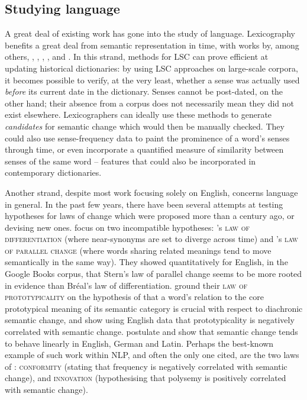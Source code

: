 \documentclass[output=paper]{langscibook}
\begin{document}
\subsection{Studying language}

A great deal of  existing work has gone into the study of language. 
Lexicography benefits a great deal from semantic representation in time, with works by, among others, \citet{lau-etal-2012-word},  \citet{falk2014}, \citet{fiser-ljubesic-2018}, \citet{klosaluengen}, and \citet{torresrivera2020detecting}.
In this strand, methods for LSC can prove efficient at updating historical dictionaries: by using LSC approaches on large-scale corpora, it becomes possible to verify, at the very least, whether a sense was actually used \emph{before} its current date in the dictionary. 
Senses cannot be post-dated, on the other hand; their absence from a corpus does not necessarily mean they did not exist elsewhere. 
Lexicographers can ideally use these methods to generate \emph{candidates} for semantic change which would then be manually checked. They could also use sense-frequency data to paint the prominence of a word's senses through time, or even incorporate a quantified measure of similarity between senses of the same word -- features that could also be incorporated in contemporary dictionaries.

Another strand, despite most work focusing solely on English, concerns language in general. 
In the past few years, there have been several attempts at testing hypotheses for laws of change which were proposed more than a century ago, or devising new ones.
\citet{xu15} focus on two incompatible hypotheses: \citet{breal1897essai}'s \textsc{law of differentiation} (where near-synonyms are set to diverge across time) and \citet{stern1921swift}'s \textsc{law of parallel change} (where words sharing related meanings tend to move semantically in the same way). They showed quantitatively for English, in the Google Books corpus, that Stern's law of parallel change seems to be more rooted in evidence than Bréal's law of differentiation. 
\citet{dubossarsky2015bottom} ground their \textsc{law of prototypicality} on the hypothesis of \citet{geeraerts1997diachronic} that a word's relation to the core prototypical meaning of its semantic category is crucial with respect to diachronic semantic change, and show using English data that prototypicality is negatively correlated with semantic change.
\citet{eger-mehler-2016-linearity} postulate and show that semantic change tends to behave linearly in English, German and Latin.
Perhaps the best-known example of such work within NLP, and often the only one cited, are the two laws  of \citet{hamilton-etal-2016-diachronic}: \textsc{conformity} (stating that frequency is negatively correlated with semantic change), and \textsc{innovation} (hypothesising that polysemy is positively correlated with semantic change).
\end{document}
